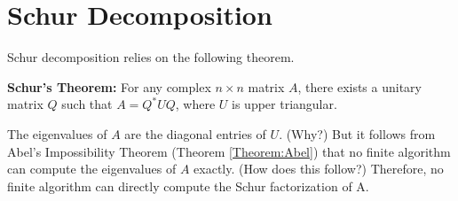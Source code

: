 \label{Ch:Jordan}


\section*{Schur Decomposition}
Schur decomposition relies on the following theorem.


\begin{theorem}
{\bf Schur's Theorem:} For any complex \footnotemark $n \times n$ matrix $A$, there exists a unitary matrix $Q$ such that $A = Q^\ast U Q$, where $U$ is upper triangular.
\end{theorem}


The eigenvalues of $A$ are the diagonal entries of $U$. (Why?) But it follows from Abel's Impossibility Theorem (Theorem \ref{Theorem:Abel}) that no finite algorithm can compute the eigenvalues of $A$ exactly. (How does this follow?) Therefore, no finite algorithm can directly compute the Schur factorization of A.
